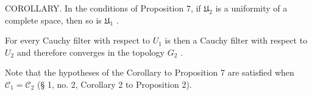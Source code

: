 COROLLARY. In the conditions of Proposition 7, if \(\mathfrak{U}_2\) is a uniformity of a complete space, then so is \(\mathfrak{U}_1\) .

For every Cauchy filter with respect to \(U_{1}\) is then a Cauchy filter with respect to \(U_{2}\) and therefore converges in the topology \(G_{2}\) .

Note that the hypotheses of the Corollary to Proposition 7 are satisfied when \(\mathcal{C}_1 = \mathcal{C}_2\) (§ 1, no. 2, Corollary 2 to Proposition 2).

